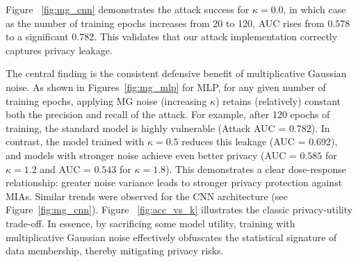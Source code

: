 \documentclass[10pt]{article} %
\theoremstyle{definition}
\theoremstyle{plain}
\begin{document}
Figure ~\ref{fig:mg_cnn} demonstrates the attack success for $\kappa=0.0$, in which case as the number of training epochs increases from 20 to 120, AUC rises from $0.578$ to a significant $0.782$. This validates that our attack implementation correctly captures privacy leakage.

The central finding is the consistent defensive benefit of multiplicative Gaussian noise. As shown in Figures~\ref{fig:mg_mlp} for MLP, for any given number of training epochs, applying MG noise (increasing $\kappa$) retains (relatively) constant both the precision and recall of the attack. For example, after 120 epochs of training, the standard model is highly vulnerable (Attack AUC = $0.782$). In contrast, the model trained with $\kappa=0.5$ reduces this leakage (AUC = $0.692$), and models with stronger noise achieve even better privacy (AUC = $0.585$ for $\kappa=1.2$ and AUC = $0.543$ for $\kappa=1.8$). This demonstrates a clear dose-response relationship: greater noise variance leads to stronger privacy protection against MIAs. Similar trends were observed for the CNN architecture (see Figure~\ref{fig:mg_cnn}).
Figure ~\ref{fig:acc_vs_k} illustrates the classic privacy-utility trade-off. In essence, by sacrificing some model utility, training with multiplicative Gaussian noise effectively obfuscates the statistical signature of data membership, thereby mitigating privacy risks.
\end{document}
